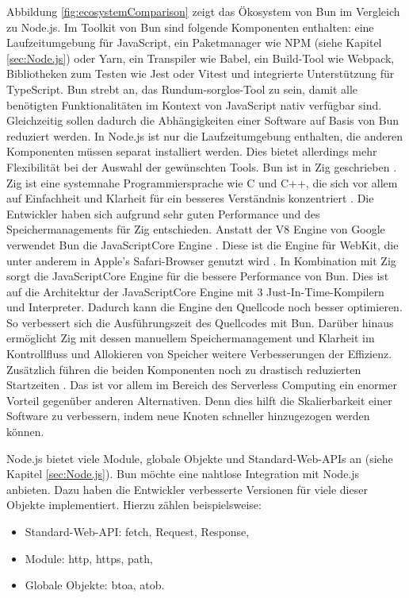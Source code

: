 \noindent
Abbildung \ref{fig:ecosystemComparison} zeigt das Ökosystem von Bun im Vergleich zu Node.js. Im Toolkit von Bun sind folgende Komponenten enthalten: eine Laufzeitumgebung für JavaScript, ein Paketmanager wie NPM (siehe Kapitel \ref{sec:Node.js}) oder Yarn, ein Transpiler wie Babel, ein Build-Tool wie Webpack, Bibliotheken zum Testen wie Jest oder Vitest und integrierte Unterstützung für TypeScript. \cite{Sumner.2023} Bun strebt an, das Rundum-sorglos-Tool zu sein, damit alle benötigten Funktionalitäten im Kontext von JavaScript nativ verfügbar sind. Gleichzeitig sollen dadurch die Abhängigkeiten einer Software auf Basis von Bun reduziert werden. \cite{Bun.} In Node.js ist nur die Laufzeitumgebung enthalten, die anderen Komponenten müssen separat installiert werden. \cite{Springer.2022} Dies bietet allerdings mehr Flexibilität bei der Auswahl der gewünschten Tools. \newline
Bun ist in Zig geschrieben \cite{Bun.}. Zig ist eine systemnahe Programmiersprache wie C und C++, die sich vor allem auf Einfachheit und Klarheit für ein besseres Verständnis konzentriert \cite{ZigSoftwareFoundation.o.J.}. Die Entwickler haben sich aufgrund sehr guten Performance und des Speichermanagements für Zig entschieden. Anstatt der V8 Engine von Google verwendet Bun die JavaScriptCore Engine \cite{Bun.}. Diese ist die Engine für WebKit, die unter anderem in Apple's Safari-Browser genutzt wird \cite{Apple.o.J.}. In Kombination mit Zig sorgt die JavaScriptCore Engine für die bessere Performance von Bun. Dies ist auf die Architektur der JavaScriptCore Engine mit 3 Just-In-Time-Kompilern und Interpreter. Dadurch kann die Engine den Quellcode noch besser optimieren. So verbessert sich die Ausführungszeit des Quellcodes mit Bun. \cite{Apple.o.J.b} Darüber hinaus ermöglicht Zig mit dessen manuellem Speichermanagement und Klarheit im Kontrollfluss und Allokieren von Speicher weitere Verbesserungen der Effizienz. \cite{Bun.} Zusätzlich führen die beiden Komponenten noch zu drastisch reduzierten Startzeiten \cite{Bun.}. Das ist vor allem im Bereich des Serverless Computing ein enormer Vorteil gegenüber anderen Alternativen. Denn dies hilft die Skalierbarkeit einer Software zu verbessern, indem neue Knoten schneller hinzugezogen werden können. \cite{Silva.2020} 

\noindent
Node.js bietet viele Module, globale Objekte und Standard-Web-APIs an (siehe Kapitel \ref{sec:Node.js}). Bun möchte eine nahtlose Integration mit Node.js anbieten. Dazu haben die Entwickler verbesserte Versionen für viele dieser Objekte implementiert. Hierzu zählen beispielsweise:
\begin{itemize}
	\item Standard-Web-API: fetch, Request, Response,
	\item Module: http, https, path,
	\item Globale Objekte: btoa, atob. \cite{Bun.} 
\end{itemize} 

